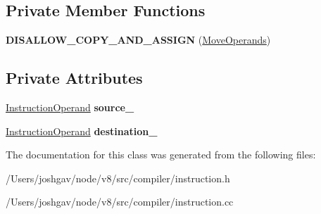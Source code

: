 \subsection*{Private Member Functions}
\begin{DoxyCompactItemize}
\item 
{\bfseries D\+I\+S\+A\+L\+L\+O\+W\+\_\+\+C\+O\+P\+Y\+\_\+\+A\+N\+D\+\_\+\+A\+S\+S\+I\+GN} (\hyperlink{classv8_1_1internal_1_1compiler_1_1_move_operands}{Move\+Operands})\hypertarget{classv8_1_1internal_1_1compiler_1_1_move_operands_a2ec95f746b7c92077bb65d3190e309dd}{}\label{classv8_1_1internal_1_1compiler_1_1_move_operands_a2ec95f746b7c92077bb65d3190e309dd}

\end{DoxyCompactItemize}
\subsection*{Private Attributes}
\begin{DoxyCompactItemize}
\item 
\hyperlink{classv8_1_1internal_1_1compiler_1_1_instruction_operand}{Instruction\+Operand} {\bfseries source\+\_\+}\hypertarget{classv8_1_1internal_1_1compiler_1_1_move_operands_a5565dd620c82cf6654921c65171a2596}{}\label{classv8_1_1internal_1_1compiler_1_1_move_operands_a5565dd620c82cf6654921c65171a2596}

\item 
\hyperlink{classv8_1_1internal_1_1compiler_1_1_instruction_operand}{Instruction\+Operand} {\bfseries destination\+\_\+}\hypertarget{classv8_1_1internal_1_1compiler_1_1_move_operands_a96f73d90e62228ae15411a6677226f7d}{}\label{classv8_1_1internal_1_1compiler_1_1_move_operands_a96f73d90e62228ae15411a6677226f7d}

\end{DoxyCompactItemize}


The documentation for this class was generated from the following files\+:\begin{DoxyCompactItemize}
\item 
/\+Users/joshgav/node/v8/src/compiler/instruction.\+h\item 
/\+Users/joshgav/node/v8/src/compiler/instruction.\+cc\end{DoxyCompactItemize}
